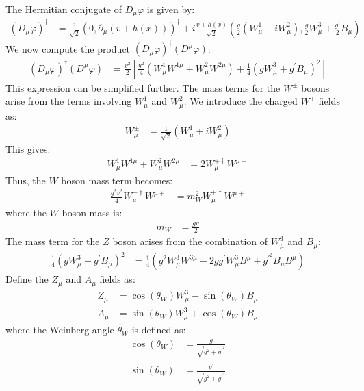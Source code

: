 The Hermitian conjugate of $D_\mu \varphi$ is given by:
\begin{align}
    (D_\mu \varphi)^\dagger &= \frac{1}{\sqrt{2}} \left( 0, \partial_\mu (v + h(x)) \right)^\dagger + i \frac{v + h(x)}{\sqrt{2}} \left( \frac{g}{2} (W_\mu^1 - i W_\mu^2), \frac{g}{2} W_\mu^3 + \frac{g^\prime }{2} B_\mu \right)
\end{align}
We now compute the product $(D_\mu \varphi)^\dagger (D^\mu \varphi)$:
\begin{align}
    (D_\mu \varphi)^\dagger (D^\mu \varphi) &= \frac{v^2}{2} \left[ \frac{g^2}{4} \left( W_\mu^1 W^{1\mu} + W_\mu^2 W^{2\mu} \right) + \frac{1}{4} (g W_\mu^3 + g^\prime B_\mu)^2 \right]
\end{align}
This expression can be simplified further. The mass terms for the $W^\pm$ bosons arise from the terms involving $W_\mu^1$ and $W_\mu^2$. We introduce the charged $W^\pm$ fields as:
\begin{align}
    W_\mu^\pm &= \frac{1}{\sqrt{2}} (W_\mu^1 \mp i W_\mu^2)
\end{align}
This gives:
\begin{align*}
    W_\mu^1 W^{1\mu} + W_\mu^2 W^{2\mu} &= 2 W^{+\dagger}_\mu W^{\mu+}
\end{align*}
Thus, the $W$ boson mass term becomes:
\begin{align}
    \frac{g^2 v^2}{4} W^{+\dagger}_\mu W^{\mu+} &= m_W^2 W^{+\dagger}_\mu W^{\mu+}
\end{align}
where the $W$ boson mass is:
\begin{align}
    m_W &= \frac{gv}{2}
\end{align}
The mass term for the $Z$ boson arises from the combination of $W_\mu^3$ and $B_\mu$:
\begin{align}
    \frac{1}{4} (g W_\mu^3 - g^\prime B_\mu)^2 &= \frac{1}{4} (g^2 W_\mu^3 W^{3\mu} - 2 g g^\prime W_\mu^3 B^\mu + g^\prime ^2 B_\mu B^\mu)
\end{align}
Define the $Z_\mu$ and $A_\mu$ fields as:
\begin{align}
    Z_\mu &= \cos(\theta_W) W_\mu^3 - \sin(\theta_W) B_\mu \label{eq:Z-mu-def}\\
    A_\mu &= \sin(\theta_W) W_\mu^3 + \cos(\theta_W) B_\mu \label{eq:A-mu-def}
\end{align}
where the Weinberg angle $\theta_W$ is defined as:
\begin{align}
    \cos(\theta_W) &= \frac{g}{\sqrt{g^2 + g^\prime ^2}} \label{eq;cos-weinberg-def}\\
    \sin(\theta_W) &= \frac{g^\prime }{\sqrt{g^2 + g^\prime ^2}} \label{eq;sin-weinberg-def}
\end{align}
